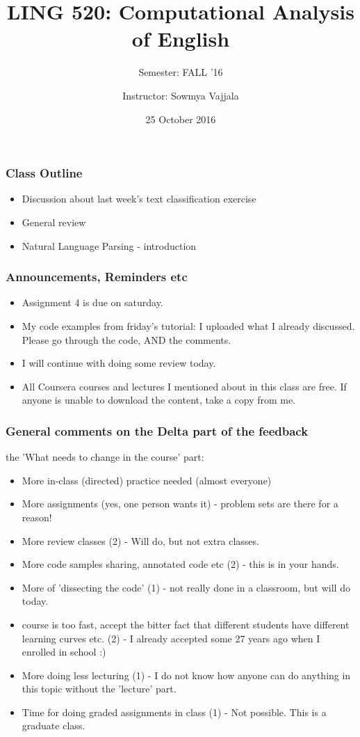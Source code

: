 \documentclass{beamer}
\author[Sowmya Vajjala]{Instructor: Sowmya Vajjala}
\title[LING 520]{LING 520: Computational Analysis of English}
\subtitle{Semester: FALL '16}
\date{25 October 2016}
\institute{Iowa State University, USA}
\begin{document}
\begin{frame}\titlepage
\end{frame}

\begin{frame}
\frametitle{Class Outline}
\begin{itemize}
\item Discussion about last week's text classification exercise
\item General review
\item Natural Language Parsing - introduction
\end{itemize}
\end{frame}

\begin{frame}
\frametitle{Announcements, Reminders etc}
\begin{itemize}
\item Assignment 4 is due on saturday.
\item My code examples from friday's tutorial: I uploaded what I already discussed. Please go through the code, AND the comments.
\item I will continue with doing some review today.
\item All Coursera courses and lectures I mentioned about in this class are free. If anyone is unable to download the content, take a copy from me.
\end{itemize}
\end{frame}

\begin{frame}
\frametitle{General comments on the Delta part of the feedback}
the 'What needs to change in the course' part:
\begin{itemize}
\item More in-class (directed) practice needed (almost everyone) \pause
\item More assignments (yes, one person wants it) - problem sets are there for a reason! \pause
\item More review classes (2) - Will do, but not extra classes. \pause
\item More code samples sharing, annotated code etc (2) - this is in your hands. \pause
\item More of 'dissecting the code' (1) - not really done in a classroom, but will do today. \pause
\item course is too fast, accept the bitter fact that different students have different learning curves etc. (2) - I already accepted some 27 years ago when I enrolled in school :) \pause
\item More doing less lecturing (1) - I do not know how anyone can do anything in this topic without the 'lecture' part.  \pause
\item Time for doing graded assignments in class (1) - Not possible. This is a graduate class. \pause
\end{itemize}
\end{frame}
\end{document}
